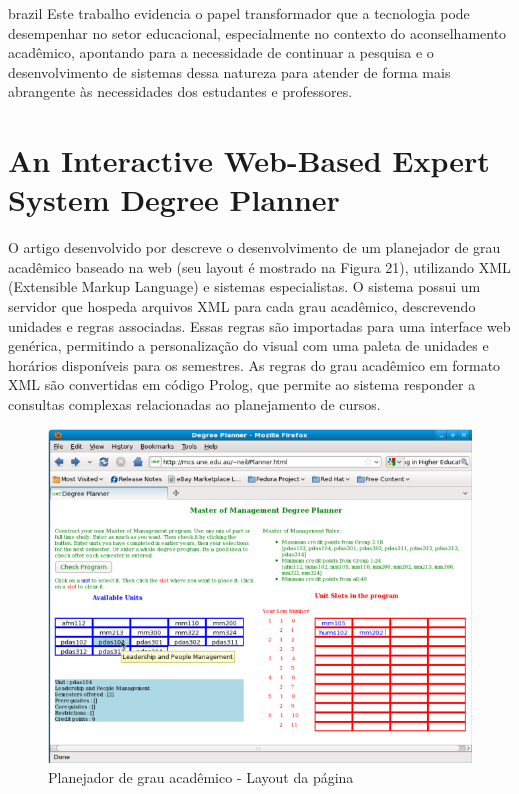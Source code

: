 \begin{otherlanguage*}{brazil}
Este trabalho evidencia o papel transformador que a tecnologia pode desempenhar no setor educacional, especialmente no contexto do aconselhamento acadêmico, apontando para a necessidade de continuar a pesquisa e o desenvolvimento de sistemas dessa natureza para atender de forma mais abrangente às necessidades dos estudantes e professores.


\section{An Interactive Web-Based Expert System Degree Planner}

O artigo desenvolvido por \textcite{neildunstan} descreve o desenvolvimento de um planejador de grau acadêmico baseado na web (seu layout é mostrado na Figura 21), utilizando XML (Extensible Markup Language) e sistemas especialistas. O sistema possui um servidor que hospeda arquivos XML para cada grau acadêmico, descrevendo unidades e regras associadas. Essas regras são importadas para uma interface web genérica, permitindo a personalização do visual com uma paleta de unidades e horários disponíveis para os semestres. As regras do grau acadêmico em formato XML são convertidas em código Prolog, que permite ao sistema responder a consultas complexas relacionadas ao planejamento de cursos.

\begin{figure}[h!]
        \centering
         \caption{Planejador de grau acadêmico - Layout da página}
         \label{fig:ModeloConceitual}
                \includegraphics[scale=0.5]{pictures/degree_planner_page_layout.png}
\end{figure}


\end{otherlanguage*}
